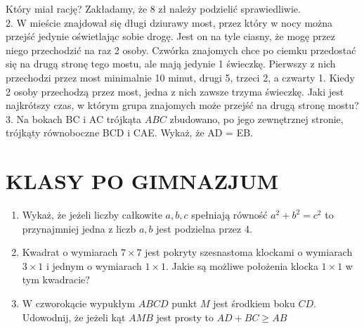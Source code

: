 \documentclass[10pt]{article}
\begin{document}
Który miał rację? Zakładamy, że 8 zł należy podzielić sprawiedliwie.\\
2. W mieście znajdował się długi dziurawy most, przez który w nocy można przejść jedynie oświetlając sobie drogę. Jest on na tyle ciasny, że mogę przez niego przechodzić na raz 2 osoby. Czwórka znajomych chce po ciemku przedostać się na drugą stronę tego mostu, ale mają jedynie 1 świeczkę. Pierwszy z nich przechodzi przez most minimalnie 10 minut, drugi 5, trzeci 2, a czwarty 1. Kiedy 2 osoby przechodzą przez most, jedna z nich zawsze trzyma świeczkę. Jaki jest najkrótszy czas, w którym grupa znajomych może przejść na drugą stronę mostu?\\
3. Na bokach BC i AC trójkąta \(A B C\) zbudowano, po jego zewnętrznej stronie, trójkąty równoboczne BCD i CAE. Wykaż, że AD = EB.

\section*{KLASY PO GIMNAZJUM}
\begin{enumerate}
  \item Wykaż, że jeżeli liczby całkowite \(a, b, c\) spełniają równość \(a^{2}+b^{2}=c^{2}\) to przynajmniej jedna z liczb \(a, b\) jest podzielna przez 4.
  \item Kwadrat o wymiarach \(7 \times 7\) jest pokryty szesnastoma klockami o wymiarach \(3 \times 1\) i jednym o wymiarach \(1 \times 1\). Jakie są możliwe położenia klocka \(1 \times 1\) w tym kwadracie?
  \item W czworokącie wypukłym \(A B C D\) punkt \(M\) jest środkiem boku \(C D\). Udowodnij, że jeżeli kąt \(A M B\) jest prosty to \(A D+B C \geq A B\)
\end{enumerate}
\end{document}
